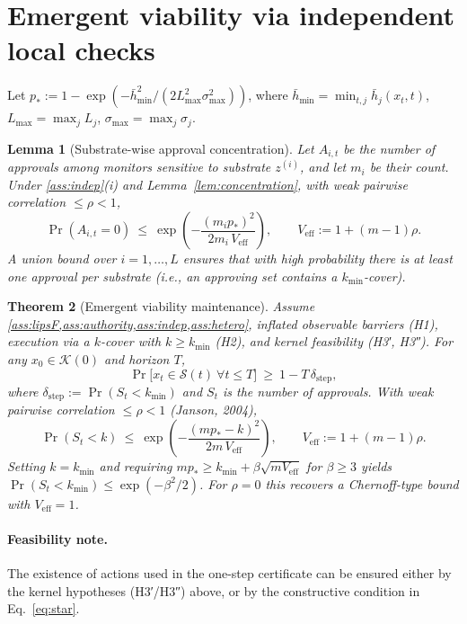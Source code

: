 \documentclass[11pt]{article}
\newtheorem{theorem}{Theorem}[section]
\newtheorem{lemma}[theorem]{Lemma}
\theoremstyle{definition}
\newcommand{\K}{\mathcal{K}}
\newcommand{\Sset}{\mathcal{S}}
\begin{document}
\section{Emergent viability via independent local checks}
Let $p_\ast:=1-\exp(-\bar h_{\min}^2/(2L_{\max}^2\sigma_{\max}^2))$, where $\bar h_{\min}=\min_{t,j}\bar h_j(x_t,t)$, $L_{\max}=\max_j L_j$, $\sigma_{\max}=\max_j \sigma_j$.

\begin{lemma}[Substrate-wise approval concentration]\label{lem:substrate_conc}
Let $A_{i,t}$ be the number of approvals among monitors sensitive to substrate $z^{(i)}$, and let $m_i$ be their count. Under \cref{ass:indep}(i) and Lemma~\ref{lem:concentration}, with weak pairwise correlation $\le \rho<1$,
\[
\Pr(A_{i,t}=0)\ \le\ \exp\!\left(-\frac{(m_i p_\ast)^2}{2 m_i\,V_{\mathrm{eff}}}\right),\qquad
V_{\mathrm{eff}}:=1+(m-1)\rho.
\]
A union bound over $i=1,\dots,L$ ensures that with high probability there is at least one approval per substrate (i.e., an approving set contains a $k_{\min}$-cover).
\end{lemma}

\begin{theorem}[Emergent viability maintenance]\label{thm:emergence}
Assume \cref{ass:lipsF,ass:authority,ass:indep,ass:hetero}, inflated observable barriers (H1), execution via a $k$-cover with $k\ge k_{\min}$ (H2), and kernel feasibility (H3′, H3″). For any $x_0\in \K(0)$ and horizon $T$,
\[
\Pr\big[x_t\in \Sset(t)\ \forall t\le T\big]\ \ge\ 1 - T\,\delta_{\mathrm{step}},
\]
where $\delta_{\mathrm{step}}:=\Pr(S_t<k_{\min})$ and $S_t$ is the number of approvals. With weak pairwise correlation $\le \rho<1$ (Janson, 2004),
\[
\Pr(S_t<k)\ \le\ \exp\!\left(-\frac{(m p_\ast-k)^2}{2m\,V_{\mathrm{eff}}}\right),
\qquad V_{\mathrm{eff}}:=1+(m-1)\rho.
\]
Setting $k=k_{\min}$ and requiring $m p_\ast \ge k_{\min} + \beta\sqrt{m V_{\mathrm{eff}}}$ for $\beta\ge 3$ yields $\Pr(S_t<k_{\min})\le \exp(-\beta^2/2)$. For $\rho=0$ this recovers a Chernoff-type bound with $V_{\mathrm{eff}}=1$.
\end{theorem}

\paragraph{Feasibility note.} The existence of actions used in the one-step certificate can be ensured either by the kernel hypotheses (H3′/H3″) above, or by the constructive condition in Eq.~\eqref{eq:star}.
\end{document}
